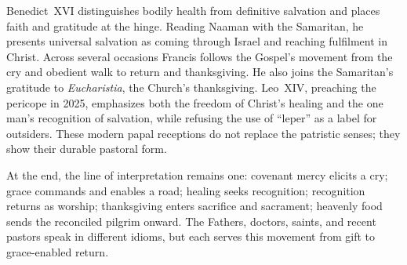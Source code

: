 Benedict~XVI distinguishes bodily health from definitive salvation and places
faith and gratitude at the hinge. Reading Naaman with the Samaritan, he presents
universal salvation as coming through Israel and reaching fulfilment in
Christ. Across several occasions Francis follows the Gospel's movement from
the cry and obedient walk to return and thanksgiving. He also
joins the Samaritan's gratitude to \emph{Eucharistia}, the Church's thanksgiving.
Leo~XIV, preaching the pericope in 2025, emphasizes both the freedom of Christ's
healing and the one man's recognition of salvation, while refusing the use of
``leper'' as a label for outsiders. These modern papal receptions do not
replace the patristic senses; they show their durable pastoral form.

At the end, the line of interpretation remains one: covenant mercy elicits a
cry; grace commands and enables a road; healing seeks recognition; recognition
returns as worship; thanksgiving enters sacrifice and sacrament; heavenly food
sends the reconciled pilgrim onward. The Fathers, doctors, saints, and recent
pastors speak in different idioms, but each serves this movement from gift to
grace-enabled return.
